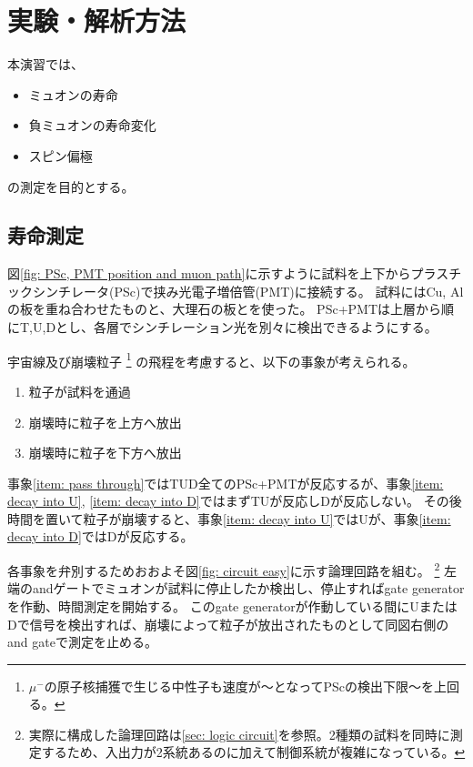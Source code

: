 \documentclass[dvipdfmx]{jsarticle}
\begin{document}
\section{実験・解析方法}

本演習では、
\begin{itemize}
    \item ミュオンの寿命
    \item 負ミュオンの寿命変化
    \item スピン偏極
\end{itemize}
の測定を目的とする。

\subsection{寿命測定}
\label{sec: method: life}

図\ref{fig: PSc, PMT position and muon path}に示すように試料を上下からプラスチックシンチレータ(PSc)で挟み光電子増倍管(PMT)に接続する。
試料にはCu, Alの板を重ね合わせたものと、大理石の板とを使った。
PSc+PMTは上層から順にT,U,Dとし、各層でシンチレーション光を別々に検出できるようにする。

宇宙線及び崩壊粒子
\footnote{$\mu^-$の原子核捕獲で生じる中性子も速度が〜となってPScの検出下限〜を上回る。}
の飛程を考慮すると、以下の事象が考えられる。
\renewcommand{\theenumi}{(\alph{enumi})}
\begin{enumerate}
    \item \label{item: pass through}粒子が試料を通過
    \item \label{item: decay into U}崩壊時に粒子を上方へ放出
    \item \label{item: decay into D}崩壊時に粒子を下方へ放出
\end{enumerate}
事象\ref{item: pass through}ではTUD全てのPSc+PMTが反応するが、事象\ref{item: decay into U}, \ref{item: decay into D}ではまずTUが反応しDが反応しない。
その後時間を置いて粒子が崩壊すると、事象\ref{item: decay into U}ではUが、事象\ref{item: decay into D}ではDが反応する。

各事象を弁別するためおおよそ図\ref{fig: circuit easy}に示す論理回路を組む。
\footnote{実際に構成した論理回路は\ref{sec: logic circuit}を参照。2種類の試料を同時に測定するため、入出力が2系統あるのに加えて制御系統が複雑になっている。}
左端のandゲートでミュオンが試料に停止したか検出し、停止すればgate generatorを作動、時間測定を開始する。
このgate generatorが作動している間にUまたはDで信号を検出すれば、崩壊によって粒子が放出されたものとして同図右側のand gateで測定を止める。
\end{document}

